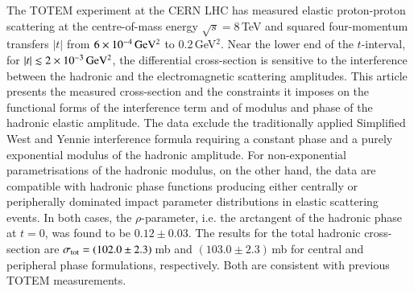 The TOTEM experiment at the CERN LHC has measured elastic proton-proton 
scattering at the centre-of-mass energy 
$\sqrt{s}=8\,$TeV and squared four-momentum transfers $|t|$ from $6\times10^{-4}\,\rm GeV^{2}$ to 0.2\,GeV$^{2}$.
Near the lower end of the $t$-interval, for
$|t| \lesssim 2\times10^{-3}\,\rm GeV^{2}$, the differential cross-section is 
sensitive to the 
interference between the hadronic and the electromagnetic scattering amplitudes.
This article presents the measured cross-section and the constraints it 
imposes on the functional forms of the interference term and of modulus and
phase of the hadronic elastic amplitude. The data exclude the traditionally 
applied Simplified West and Yennie interference formula requiring a constant 
phase and a purely exponential modulus of the hadronic amplitude. 
For non-exponential parametrisations of the hadronic 
modulus, on the other hand, the data are compatible with hadronic phase 
functions producing either centrally or peripherally dominated impact 
parameter distributions in elastic scattering events. In both cases, 
the $\rho$-parameter, i.e. the arctangent of the hadronic phase at $t = 0$,
was found to be $0.12 \pm 0.03$. The results for the total hadronic 
cross-section are $\sigma_{\rm tot} = (102.0 \pm 2.3)$\,mb and 
$(103.0 \pm 2.3)$\,mb for central and peripheral phase formulations, 
respectively. Both are consistent with previous TOTEM measurements.

